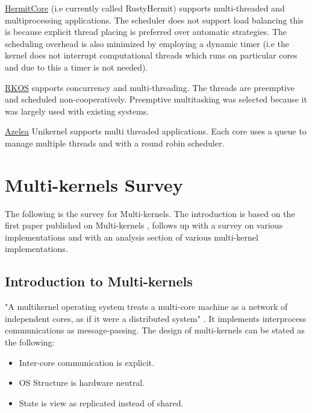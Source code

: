 \underline{HermitCore} (i.e currently called RustyHermit) supports multi-threaded and 
multiprocessing applications. The scheduler does not support load balancing 
this is because explicit thread placing is preferred over automatic 
strategies. The scheduling overhead is also minimized by employing a 
dynamic timer (i.e the kernel does not interrupt computational threads which runs on 
particular cores and due to this a timer is not needed).
\hfill \break

\underline{RKOS} supports concurrency and multi-threading. The threads are preemptive and scheduled non-cooperatively.
Preemptive multitasking was selected because it was largely used with existing systems. 
\hfill \break

\underline{Azelea} Unikernel supports multi threaded applications. Each core uses a queue to manage multiple threads 
and with a round robin scheduler. 






\section[Multi-kernels]{Multi-kernels Survey}
\label{Multi-kernels}
The following is the survey for Multi-kernels. The introduction is 
based on the first paper published on Multi-kernels \cite{multi_kernel_first_paper},
follows up with a survey on various implementations and with an 
analysis section of various multi-kernel implementations. 


\subsection{Introduction to Multi-kernels}
"A multikernel operating system treats a multi-core machine as a network of independent cores, as if it were a distributed system" \cite{Multi_kernel_wikipedia}.
It implements interprocess communications as message-passing. The design of multi-kernels can be stated as the following: 
\begin{itemize}
  \item Inter-core communication is explicit. 
  \item OS Structure is hardware neutral.
  \item State is view as replicated instead of shared.
\end{itemize}

